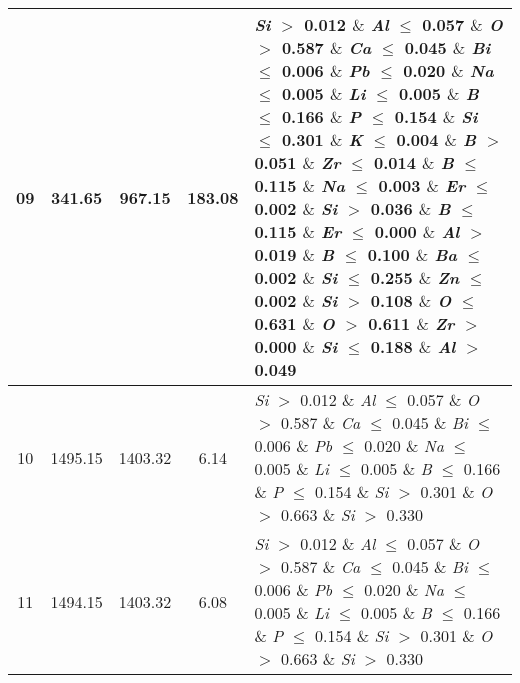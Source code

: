 \begin{table}[!htbp]
\begin{tabular}{ccccp{}}
		09 & 341.65 & 967.15 & 183.08 & \textit{Si} $>$ 0.012 $\&$ \textit{Al} $\le$ 0.057 $\&$ \textit{O} $>$ 0.587 $\&$ \textit{Ca} $\le$ 0.045 $\&$ \textit{Bi} $\le$ 0.006 $\&$ \textit{Pb} $\le$ 0.020 $\&$ \textit{Na} $\le$ 0.005 $\&$ \textit{Li} $\le$ 0.005 $\&$ \textit{B} $\le$ 0.166 $\&$ \textit{P} $\le$ 0.154 $\&$ \textit{Si} $\le$ 0.301 $\&$ \textit{K} $\le$ 0.004 $\&$ \textit{B} $>$ 0.051 $\&$ \textit{Zr} $\le$ 0.014 $\&$ \textit{B} $\le$ 0.115 $\&$ \textit{Na} $\le$ 0.003 $\&$ \textit{Er} $\le$ 0.002 $\&$ \textit{Si} $>$ 0.036 $\&$ \textit{B} $\le$ 0.115 $\&$ \textit{Er} $\le$ 0.000 $\&$ \textit{Al} $>$ 0.019 $\&$ \textit{B} $\le$ 0.100 $\&$ \textit{Ba} $\le$ 0.002 $\&$ \textit{Si} $\le$ 0.255 $\&$ \textit{Zn} $\le$ 0.002 $\&$ \textit{Si} $>$ 0.108 $\&$ \textit{O} $\le$ 0.631 $\&$ \textit{O} $>$ 0.611 $\&$ \textit{Zr} $>$ 0.000 $\&$ \textit{Si} $\le$ 0.188 $\&$ \textit{Al} $>$ 0.049\\
		\hline
		10 & 1495.15 & 1403.32 & 6.14 & \textit{Si} $>$ 0.012 $\&$ \textit{Al} $\le$ 0.057 $\&$ \textit{O} $>$ 0.587 $\&$ \textit{Ca} $\le$ 0.045 $\&$ \textit{Bi} $\le$ 0.006 $\&$ \textit{Pb} $\le$ 0.020 $\&$ \textit{Na} $\le$ 0.005 $\&$ \textit{Li} $\le$ 0.005 $\&$ \textit{B} $\le$ 0.166 $\&$ \textit{P} $\le$ 0.154 $\&$ \textit{Si} $>$ 0.301 $\&$ \textit{O} $>$ 0.663 $\&$ \textit{Si} $>$ 0.330\\
		\hline
		11 & 1494.15 & 1403.32 & 6.08 & \textit{Si} $>$ 0.012 $\&$ \textit{Al} $\le$ 0.057 $\&$ \textit{O} $>$ 0.587 $\&$ \textit{Ca} $\le$ 0.045 $\&$ \textit{Bi} $\le$ 0.006 $\&$ \textit{Pb} $\le$ 0.020 $\&$ \textit{Na} $\le$ 0.005 $\&$ \textit{Li} $\le$ 0.005 $\&$ \textit{B} $\le$ 0.166 $\&$ \textit{P} $\le$ 0.154 $\&$ \textit{Si} $>$ 0.301 $\&$ \textit{O} $>$ 0.663 $\&$ \textit{Si} $>$ 0.330\\
		\bottomrule
	\end{tabular}
\end{table}
